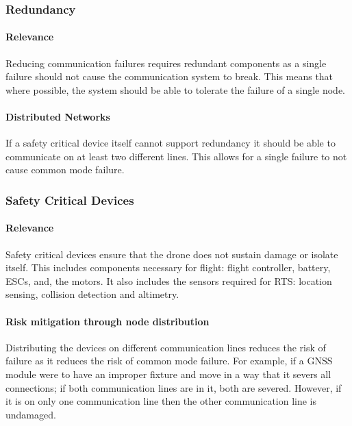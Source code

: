 \subsubsection{Redundancy}
\paragraph{Relevance}
Reducing communication failures requires redundant components as a single failure should not cause the communication system to break. This means that where possible, the system should be able to tolerate the failure of a single node.
\paragraph{Distributed Networks}
If a safety critical device itself cannot support redundancy it should be able to communicate on at least two different lines. This allows for a single failure to not cause common mode failure.

\subsubsection{Safety Critical Devices}
\paragraph{Relevance}
Safety critical devices ensure that the drone does not sustain damage or isolate itself. This includes components necessary for flight: flight controller, battery, \gls{ESC}s, and, the motors. It also includes the sensors required for \gls{RTS}: location sensing,  collision detection and altimetry.
\paragraph{Risk mitigation through node distribution}
Distributing the devices on different communication lines reduces the risk of failure as it reduces the risk of common mode failure. For example, if a \gls{GNSS} module were to have an improper fixture and move in a way that it severs all connections; if both communication lines are in it, both are severed. However, if it is on only one communication line then the other communication line is undamaged.
